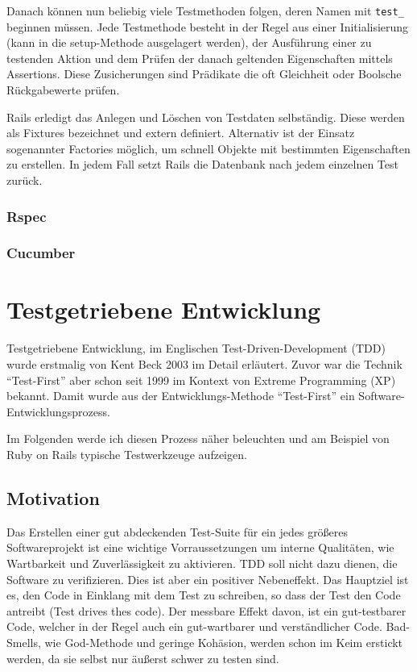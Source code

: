 Danach können nun beliebig viele Testmethoden folgen, deren Namen mit \texttt{test\_} beginnen müssen.
Jede Testmethode besteht in der Regel aus einer Initialisierung (kann in die setup-Methode ausgelagert werden), der Ausführung einer zu testenden Aktion und dem Prüfen der danach geltenden Eigenschaften mittels Assertions. Diese Zusicherungen sind Prädikate die oft Gleichheit oder Boolsche Rückgabewerte prüfen.


Rails erledigt das Anlegen und Löschen von Testdaten selbständig. Diese werden als Fixtures bezeichnet und extern definiert. Alternativ ist der Einsatz sogenannter Factories möglich, um schnell Objekte mit bestimmten Eigenschaften zu erstellen. In jedem Fall setzt Rails die Datenbank nach jedem einzelnen Test zurück.


\subsubsection{Rspec}
\subsubsection{Cucumber}

\section{Testgetriebene Entwicklung}
Testgetriebene Entwicklung, im Englischen Test-Driven-Development (TDD) wurde erstmalig von Kent Beck 2003 im Detail erläutert. Zuvor war die Technik "`Test-First"' aber schon seit 1999 im Kontext von Extreme Programming (XP) bekannt.
Damit wurde aus der Entwicklungs-Methode "`Test-First"' ein Software-Entwicklungsprozess. 

Im Folgenden werde ich diesen Prozess näher beleuchten und am Beispiel von Ruby on Rails typische Testwerkzeuge aufzeigen. \subsection{Motivation}
  Das Erstellen einer gut abdeckenden Test-Suite für ein jedes größeres Softwareprojekt ist eine wichtige Vorraussetzungen um interne Qualitäten, wie Wartbarkeit und Zuverlässigkeit zu aktivieren. TDD soll nicht dazu dienen, die Software zu verifizieren. Dies ist aber ein positiver Nebeneffekt. Das Hauptziel ist es, den Code in Einklang mit dem Test zu schreiben, so dass der Test den Code antreibt (Test drives thes code). Der messbare Effekt davon, ist ein gut-testbarer Code, welcher in der Regel auch ein gut-wartbarer und verständlicher Code. Bad-Smells, wie God-Methode und geringe Kohäsion, werden schon im Keim erstickt werden, da sie selbst nur äußerst schwer zu testen sind.
  
